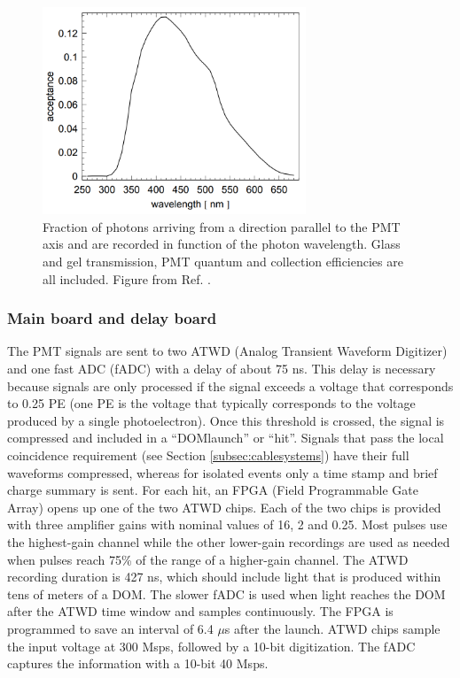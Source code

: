 \begin{figure}[t]
\centering
\includegraphics[width=0.7\textwidth]{chapter5/img/acceptanceDOM.png}
\caption{Fraction of photons arriving from a direction parallel to the PMT axis and are recorded in function of the photon wavelength. Glass and gel transmission, PMT quantum and collection efficiencies are all included. Figure from Ref. \cite{Aartsen:2013rt}.}
\label{fig:acceptance}
\end{figure}


\subsubsection{Main board and delay board}
\label{subsec:mainboard}
The PMT signals are sent to two ATWD (Analog Transient Waveform Digitizer) and one fast ADC (fADC) with a delay of about 75 ns. This delay is necessary because signals are only processed if the signal exceeds a voltage that corresponds to 0.25 PE (one PE is the voltage that typically corresponds to the voltage produced by a single photoelectron). Once this threshold is crossed, the signal is compressed and included in a ``DOMlaunch'' or ``hit''. Signals that pass the local coincidence requirement (see Section \ref{subsec:cablesystems}) have their full waveforms compressed, whereas for isolated events only a time stamp and brief charge summary is sent. For each hit, an FPGA  (Field Programmable Gate Array) opens up one of the two ATWD chips. Each of the two chips is provided with three amplifier gains with nominal values of 16, 2 and 0.25. Most pulses use the highest-gain channel while the other lower-gain recordings are used as needed when pulses reach 75\% of the range of a higher-gain channel. The ATWD recording duration is 427 ns, which should include light that is produced within tens of meters of a DOM. The slower fADC is used when light reaches the DOM after the ATWD time window and samples continuously. The FPGA is programmed to save an interval of 6.4 $\mu$s after the launch. ATWD chips sample the input voltage at 300 Msps, followed by a 10-bit digitization. The fADC captures the information with a 10-bit 40 Msps.

